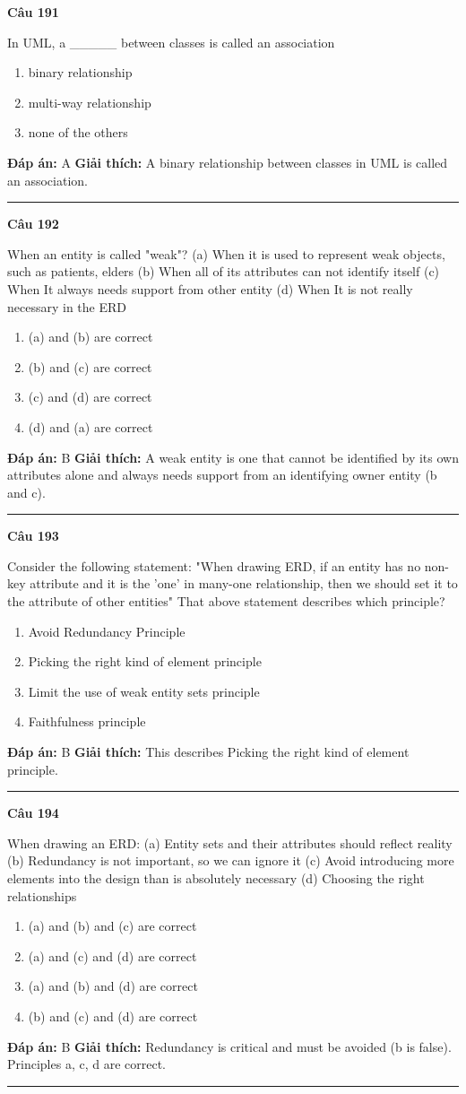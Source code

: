 \documentclass[11pt,a4paper]{article}
\newenvironment{question}[1]{%
  \par\vspace{1em}\noindent\textbf{\large Câu #1}\par\vspace{0.4em}
}{%
  \par\vspace{1em}\hrule\vspace{0.6em}
}
\newenvironment{choices}{%
  \begin{enumerate}[label=\textbf{\Alph*.},leftmargin=2.2em,itemsep=2pt,topsep=3pt]
}{%
  \end{enumerate}
}
\newcommand{\choice}{\item}
\begin{document}
\begin{question}{191}
In UML, a _____ between classes is called an association
\begin{choices}
\choice binary relationship
\choice multi-way relationship
\choice none of the others
\end{choices}
\textbf{Đáp án:} A
\textbf{Giải thích:} A binary relationship between classes in UML is called an association.
\end{question}

\begin{question}{192}
When an entity is called "weak"?
(a) When it is used to represent weak objects, such as patients, elders
(b) When all of its attributes can not identify itself
(c) When It always needs support from other entity
(d) When It is not really necessary in the ERD
\begin{choices}
\choice (a) and (b) are correct
\choice (b) and (c) are correct
\choice (c) and (d) are correct
\choice (d) and (a) are correct
\end{choices}
\textbf{Đáp án:} B
\textbf{Giải thích:} A weak entity is one that cannot be identified by its own attributes alone and always needs support from an identifying owner entity (b and c).
\end{question}

\begin{question}{193}
Consider the following statement:
"When drawing ERD, if an entity has no non-key attribute and it is the 'one' in many-one relationship, then we should set it to the attribute of other entities"
That above statement describes which principle?
\begin{choices}
\choice Avoid Redundancy Principle
\choice Picking the right kind of element principle
\choice Limit the use of weak entity sets principle
\choice Faithfulness principle
\end{choices}
\textbf{Đáp án:} B
\textbf{Giải thích:} This describes Picking the right kind of element principle.
\end{question}

\begin{question}{194}
When drawing an ERD:
(a) Entity sets and their attributes should reflect reality
(b) Redundancy is not important, so we can ignore it
(c) Avoid introducing more elements into the design than is absolutely necessary
(d) Choosing the right relationships
\begin{choices}
\choice (a) and (b) and (c) are correct
\choice (a) and (c) and (d) are correct
\choice (a) and (b) and (d) are correct
\choice (b) and (c) and (d) are correct
\end{choices}
\textbf{Đáp án:} B
\textbf{Giải thích:} Redundancy is critical and must be avoided (b is false). Principles a, c, d are correct.
\end{question}
\end{document}
